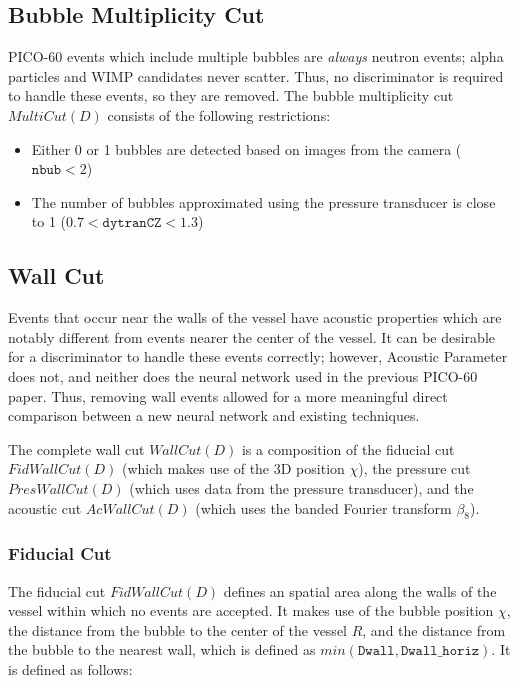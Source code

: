\documentclass[10pt]{article}
\begin{document}
\subsection{Bubble Multiplicity Cut}

PICO-60 events which include multiple bubbles are \textit{always} neutron events; alpha particles and WIMP candidates never scatter. Thus, no discriminator is required to handle these events, so they are removed. The bubble multiplicity cut $MultiCut(D)$ consists of the following restrictions:

\begin{itemize}
    \item Either 0 or 1 bubbles are detected based on images from the camera ($\texttt{nbub}<2$)
    \item The number of bubbles approximated using the pressure transducer is close to 1 ($0.7<\texttt{dytranCZ}<1.3$)
\end{itemize}

\subsection{Wall Cut}

Events that occur near the walls of the vessel have acoustic properties which are notably different from events nearer the center of the vessel. It can be desirable for a discriminator to handle these events correctly; however, Acoustic Parameter does not, and neither does the neural network used in the previous PICO-60 paper. Thus, removing wall events allowed for a more meaningful direct comparison between a new neural network and existing techniques.

The complete wall cut $WallCut(D)$ is a composition of the fiducial cut $FidWallCut(D)$ (which makes use of the 3D position $\chi$), the pressure cut $PresWallCut(D)$ (which uses data from the pressure transducer), and the acoustic cut $AcWallCut(D)$ (which uses the banded Fourier transform $\beta _{8}$).

\subsubsection{Fiducial Cut}

The fiducial cut $FidWallCut(D)$ defines an spatial area along the walls of the vessel within which no events are accepted. It makes use of the bubble position $\chi$, the distance from the bubble to the center of the vessel $R$, and the distance from the bubble to the nearest wall, which is defined as $min(\texttt{Dwall}, \texttt{Dwall\_horiz})$. It is defined as follows:
\end{document}
